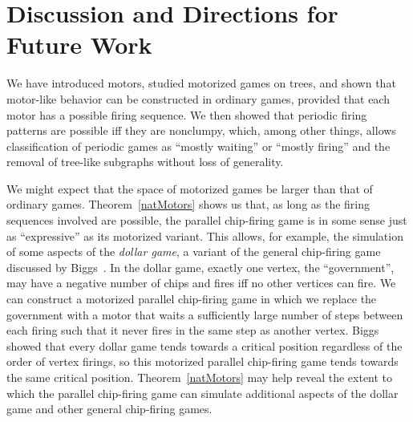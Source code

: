 \section{Discussion and Directions for Future Work} \label{discussion}

We have introduced motors, studied motorized games on trees, and shown that
motor-like behavior can be constructed in ordinary games, provided that each
motor has a possible firing sequence. We then showed that periodic firing
patterns are possible iff they are nonclumpy, which, among other things, allows
classification of periodic games as ``mostly waiting'' or ``mostly firing'' and
the removal of tree-like subgraphs without loss of generality.

We might expect that the space of motorized games be larger than that of
ordinary games. Theorem~\ref{natMotors} shows us that, as long as the firing
sequences involved are possible, the parallel chip-firing game is in some sense
just as ``expressive'' as its motorized variant. This allows, for example, the
simulation of some aspects of the \emph{dollar game}, a variant of the general
chip-firing game discussed by Biggs~\cite{biggs}. In the dollar game, exactly
one vertex, the ``government'', may have a negative number of chips and fires
iff no other vertices can fire. We can construct a motorized parallel
chip-firing game in which we replace the government with a motor that waits a
sufficiently large number of steps between each firing such that it never fires
in the same step as another vertex. Biggs showed that every dollar game tends
towards a critical position regardless of the order of vertex firings, so this
motorized parallel chip-firing game tends towards the same critical
position. Theorem~\ref{natMotors} may help reveal the extent to which the
parallel chip-firing game can simulate additional aspects of the dollar game
and other general chip-firing games.

